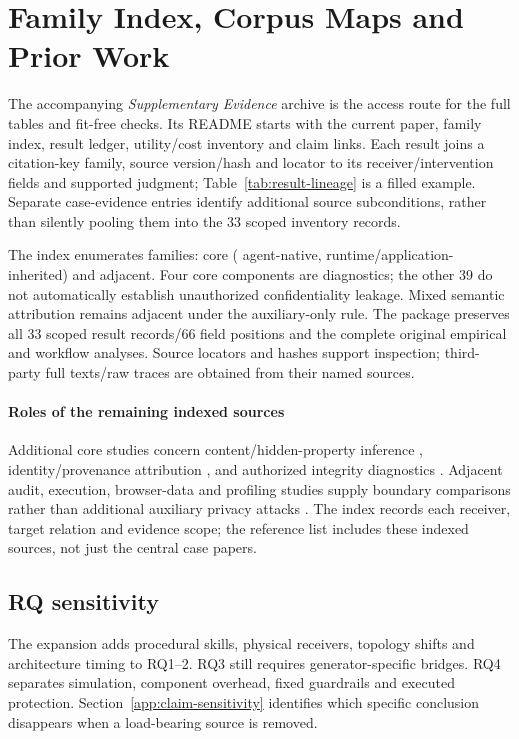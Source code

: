 \section{Family Index, Corpus Maps and Prior Work}\label{app:final-ledger}
The accompanying \emph{Supplementary Evidence} archive is the access route for the full tables and fit-free checks. Its README starts with the current paper, family index, result ledger, utility/cost inventory and claim links. Each result joins a citation-key family, source version/hash and locator to its receiver/intervention fields and supported judgment; Table~\ref{tab:result-lineage} is a filled example. Separate case-evidence entries identify additional source subconditions, rather than silently pooling them into the 33 scoped inventory records.

The index enumerates \FinalN{} families: \FinalCore{} core (\FinalA{} agent-native, \FinalB{} runtime/application-inherited) and \FinalAdjacent{} adjacent. Four core components are diagnostics; the other 39 do not automatically establish unauthorized confidentiality leakage. Mixed semantic attribution remains adjacent under the auxiliary-only rule. The package preserves all 33 scoped result records/66 field positions and the complete original empirical and workflow analyses. Source locators and hashes support inspection; third-party full texts/raw traces are obtained from their named sources.

\paragraph{Roles of the remaining indexed sources}
Additional core studies concern content/hidden-property inference \cite{abubakar2026contention,carlini2024remote,song2026personafingerprint,weiss2026detokenization,ding2025moecho,yona2024stealing}, identity/provenance attribution \cite{oderinwale2026procgrep,alhazbi2025rhythm,chaudhuri2025energon,weng2026archsnoop}, and authorized integrity diagnostics \cite{gan2026clawguard,george2025cycles,solomon2026lumimas}. Adjacent audit, execution, browser-data and profiling studies supply boundary comparisons rather than additional auxiliary privacy attacks \cite{roh2026spillage,qiao2026topr,umar2025secemb,wu2025mobileagents,mudryi2025hidden,ukani2025browserprivacy,nazari2024llmfin,anwar2026infernet}. The index records each receiver, target relation and evidence scope; the reference list includes these indexed sources, not just the central case papers.

\subsection{RQ sensitivity}\label{app:rq-sensitivity}
The expansion adds procedural skills, physical receivers, topology shifts and architecture timing to RQ1--2. RQ3 still requires generator-specific bridges. RQ4 separates simulation, component overhead, fixed guardrails and executed protection. Section~\ref{app:claim-sensitivity} identifies which specific conclusion disappears when a load-bearing source is removed.
